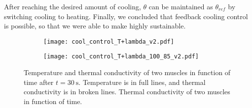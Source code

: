 After reaching the desired amount of cooling, $ \theta $ can be maintained as $\theta_{ref}$ by switching cooling to heating. Finally, we concluded that feedback cooling control is possible, so that we were able to make \apc highly sustainable.

\begin{figure}[t]
	\centering
	\begin{subfigure}[t]{0.45\textwidth}
		\centering\texttt{[image: cool\_control\_T+lambda\_v2.pdf]}
		\caption{\label{cool_control}}
	\end{subfigure}%
	\begin{subfigure}[t]{0.45\textwidth}
		\centering\texttt{[image: cool\_control\_T+lambda\_100\_85\_v2.pdf]}
		\caption{\label{cool_control_100}}
	\end{subfigure}
	\caption[Sustainable closed-loop \apc simulation]{ Temperature and thermal conductivity of two muscles in function of time after $t=\SI{30}{\second}$. Temperature is in full lines, and thermal conductivity is in broken lines.  Thermal conductivity of two muscles in function of time. }
	\label{cool_simulation}
\end{figure}




